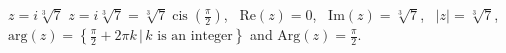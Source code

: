 { $z = i\sqrt[3]{7}$}
{ $z = i \sqrt[3]{7} = \sqrt[3]{7}\operatorname{cis}\left(\frac{\pi}{2}\right)$, \, $\text{Re}(z) =0$, \, $\text{Im}(z) = \sqrt[3]{7}$, \, $|z| = \sqrt[3]{7}$, \, $\text{arg}(z) = \left\{\frac{\pi}{2} + 2\pi k \, | \, \text{$k$ is an integer} \right\}$ and $\text{Arg}(z) = \frac{\pi}{2}$.}
